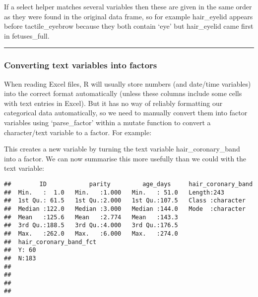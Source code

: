 \documentclass[
]{article}
\newenvironment{Shaded}{\begin{snugshade}}{\end{snugshade}}
\newcommand{\DataTypeTok}[1]{\textcolor[rgb]{0.13,0.29,0.53}{#1}}
\newcommand{\KeywordTok}[1]{\textcolor[rgb]{0.13,0.29,0.53}{\textbf{#1}}}
\newcommand{\NormalTok}[1]{#1}
\newcommand{\OperatorTok}[1]{\textcolor[rgb]{0.81,0.36,0.00}{\textbf{#1}}}
\newcommand{\StringTok}[1]{\textcolor[rgb]{0.31,0.60,0.02}{#1}}
\begin{document}
If a select helper matches several variables then these are given in the
same order as they were found in the original data frame, so for example
hair\_eyelid appears before tactile\_eyebrow because they both contain
`eye' but hair\_eyelid came first in fetuses\_full.

\begin{center}\rule{0.5\linewidth}{0.5pt}\end{center}

\hypertarget{converting-text-variables-into-factors}{%
\subsubsection{Converting text variables into
factors}\label{converting-text-variables-into-factors}}

When reading Excel files, R will usually store numbers (and date/time
variables) into the correct format automatically (unless these columns
include some cells with text entries in Excel). But it has no way of
reliably formatting our categorical data automatically, so we need to
manually convert them into factor variables using `parse\_factor' within
a mutate function to convert a character/text variable to a factor. For
example:

\begin{Shaded}
\end{Shaded}

This creates a new variable by turning the text variable
hair\_coronary\_band into a factor. We can now summarise this more
usefully than we could with the text variable:

\begin{Shaded}
\end{Shaded}

\begin{verbatim}
##        ID            parity         age_days     hair_coronary_band
##  Min.   :  1.0   Min.   :1.000   Min.   : 51.0   Length:243        
##  1st Qu.: 61.5   1st Qu.:2.000   1st Qu.:107.5   Class :character  
##  Median :122.0   Median :3.000   Median :144.0   Mode  :character  
##  Mean   :125.6   Mean   :2.774   Mean   :143.3                     
##  3rd Qu.:188.5   3rd Qu.:4.000   3rd Qu.:176.5                     
##  Max.   :262.0   Max.   :6.000   Max.   :274.0                     
##  hair_coronary_band_fct
##  Y: 60                 
##  N:183                 
##                        
##                        
##                        
## 
\end{verbatim}
\end{document}
